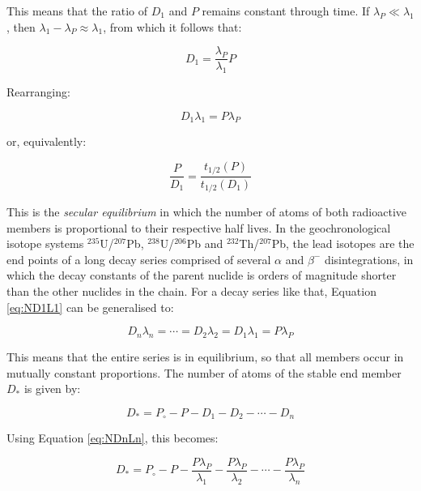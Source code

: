 This means that the ratio of $D_1$ and $P$ remains constant
through time. If $\lambda_P \ll \lambda_1$, then $\lambda_1 -
\lambda_P \approx \lambda_1$, from which it follows that:

\begin{equation}
D_1 = \frac{\lambda_P}{\lambda_1} P
\label{eq:ND1d}
\end{equation}

Rearranging:

\begin{equation}
D_1 \lambda_1 = P \lambda_P
\label{eq:ND1L1}
\end{equation}

or, equivalently:

\begin{equation}
\frac{P}{D_1} = \frac{t_{1/2}(P)}{t_{1/2}(D_1)}
\label{eq:NPND1}
\end{equation}

This is the \emph{secular equilibrium} in which the number of atoms of
both radioactive members is proportional to their respective half
lives. In the geochronological isotope systems $^{235}$U/$^{207}$Pb,
$^{238}$U/$^{206}$Pb and $^{232}$Th/$^{207}$Pb, the lead isotopes are
the end points of a long decay series comprised of several $\alpha$
and $\beta^-$ disintegrations, in which the decay constants of the
parent nuclide is orders of magnitude shorter than the other nuclides
in the chain. For a decay series like that, Equation \ref{eq:ND1L1}
can be generalised to:

\begin{equation}
D_n \lambda_n = \cdots  = D_2 \lambda_2 = D_1 \lambda_1 = P \lambda_P
\label{eq:NDnLn}
\end{equation}

This means that the entire series is in equilibrium, so that all
members occur in mutually constant proportions. The number of atoms of
the stable end member $D_*$ is given by:

\begin{equation}
D_* = P_\circ - P - D_1 - D_2 - \cdots - D_n
\label{eq:ND*}
\end{equation}

Using Equation \ref{eq:NDnLn}, this becomes:

\begin{equation}
D_* = P_\circ - P - \frac{P \lambda_P}{\lambda_1} - 
\frac{P \lambda_P}{\lambda_2} - \cdots - \frac{P \lambda_P}{\lambda_n}
\label{eq:ND*2}
\end{equation}


